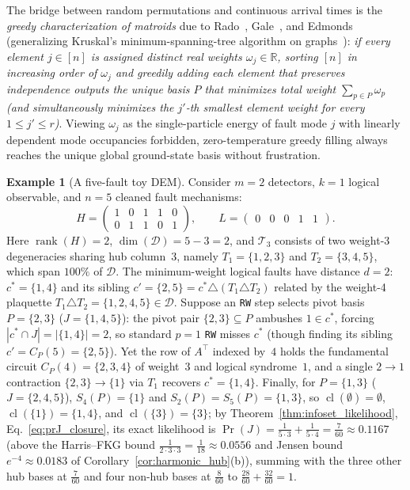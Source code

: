 \documentclass[12pt]{article}
\theoremstyle{definition}
\newtheorem{example}{Example}
\newcommand{\R}{\mathbb{R}}
\DeclareMathOperator{\rank}{rank}
\DeclareMathOperator{\cl}{cl}
\newcommand{\Dc}{\mathcal{D}}
\newcommand{\Tc}{\mathcal{T}_3}
\newcommand{\ttt}[1]{\texttt{#1}}
\begin{document}
The bridge between random permutations and continuous arrival times is the \emph{greedy characterization of
matroids} due to Rado~\cite{Rado1957}, Gale~\cite{Gale1968}, and Edmonds~\cite{Edmonds1971} (generalizing Kruskal's
minimum-spanning-tree algorithm on graphs~\cite{Kruskal1956}): \emph{if every element $j \in [n]$ is assigned
distinct real weights $\omega_j \in \R$, sorting $[n]$ in increasing order of $\omega_j$ and greedily adding each
element that preserves independence outputs the unique basis $P$ that minimizes total weight $\sum_{p \in P}
\omega_p$ (and simultaneously minimizes the $j'$-th smallest element weight for every $1 \le j' \le r$)}. Viewing
$\omega_j$ as the single-particle energy of fault mode $j$ with linearly dependent mode occupancies forbidden,
zero-temperature greedy filling always reaches the unique global ground-state basis without frustration.

\begin{example}[A five-fault toy DEM]\label{ex:toy_dem}
Consider $m = 2$ detectors, $k = 1$ logical observable, and $n = 5$ cleaned fault mechanisms:
\[
  H = \begin{pmatrix} 1 & 0 & 1 & 1 & 0 \\ 0 & 1 & 1 & 0 & 1 \end{pmatrix}, \qquad
  L = \begin{pmatrix} 0 & 0 & 0 & 1 & 1 \end{pmatrix}.
\]
Here $\rank(H) = 2$, $\dim(\Dc) = 5 - 3 = 2$, and $\Tc$ consists of two weight-3 degeneracies sharing hub column~$3$,
namely $T_1 = \{1, 2, 3\}$ and $T_2 = \{3, 4, 5\}$, which span $100\%$ of $\Dc$. The minimum-weight logical faults have
distance $d = 2$: $c^* = \{1, 4\}$ and its sibling $c' = \{2, 5\} = c^* \triangle (T_1 \triangle T_2)$ related by the
weight-4 plaquette $T_1 \triangle T_2 = \{1, 2, 4, 5\} \in \Dc$. Suppose an \ttt{RW} step selects pivot basis
$P = \{2, 3\}$ ($J = \{1, 4, 5\}$): the pivot pair $\{2, 3\} \subseteq P$ ambushes $1 \in c^*$, forcing $|c^* \cap J| =
|\{1, 4\}| = 2$, so standard $p = 1$ \ttt{RW} misses $c^*$ (though finding its sibling $c' = C_P(5) = \{2, 5\}$). Yet
the row of $A^\top$ indexed by~$4$ holds the fundamental circuit $C_P(4) = \{2, 3, 4\}$ of weight~$3$ and logical
syndrome~$1$, and a single $2 \to 1$ contraction $\{2, 3\} \to \{1\}$ via $T_1$ recovers $c^* = \{1, 4\}$. Finally, for
$P = \{1, 3\}$ ($J = \{2, 4, 5\}$), $S_4(P) = \{1\}$ and $S_2(P) = S_5(P) = \{1, 3\}$, so $\cl(\emptyset) = \emptyset$,
$\cl(\{1\}) = \{1, 4\}$, and $\cl(\{3\}) = \{3\}$; by Theorem~\ref{thm:infoset_likelihood}, Eq.~\eqref{eq:prJ_closure},
its exact likelihood is $\Pr(J) = \frac{1}{5 \cdot 3} + \frac{1}{5 \cdot 4} = \frac{7}{60} \approx 0.1167$ (above the
Harris--FKG bound $\frac{1}{2 \cdot 3 \cdot 3} = \frac{1}{18} \approx 0.0556$ and Jensen bound $e^{-4} \approx 0.0183$
of Corollary~\ref{cor:harmonic_hub}(b)), summing with the three other hub bases at $\frac{7}{60}$ and four non-hub
bases at $\frac{8}{60}$ to $\frac{28}{60} + \frac{32}{60} = 1$.
\end{example}
\end{document}
